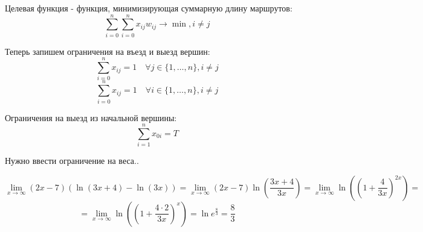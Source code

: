 \documentclass[%
10pt, %
final, %
oneside, %
onecolumn, %
centertags]{article} %
\theoremstyle{plain}
\theoremstyle{definition}
\theoremstyle{remark}
\begin{document}
Целевая функция - функция, минимизирующая суммарную длину маршрутов:
$$\sum\limits_{i=0}^n\sum\limits_{i=0}^n x_{ij}w_{ij}\to \min, i \neq j$$

Теперь запишем ограничения на въезд и выезд вершин:
$$\sum\limits_{i=0}^n x_{ij} = 1 \quad \forall j \in \{1, \ldots, n\}, i \neq j$$
$$\sum\limits_{i=0}^n x_{ij} = 1 \quad \forall i \in \{1, \ldots, n\}, i \neq j$$

Ограничения на выезд из начальной вершины:
$$\sum\limits_{i=1}^n x_{0i} = T$$

Нужно ввести ограничение на веса..

$$\lim\limits_{x \to \infty} (2x-7)(\ln(3x+4) - \ln (3x)) = \lim\limits_{x \to \infty} (2x-7)\ln\left(\frac{3x+4}{3x}\right) = \lim\limits_{x \to \infty} \ln \left(\left(1 + \frac{4}{3x}\right)^{2x}\right) = $$
$$ = \lim\limits_{x \to \infty} \ln \left(\left(1 + \frac{4 \cdot 2}{3x}\right)^{x}\right) = \ln e^{\frac{8}{3}} = \frac{8}{3}$$
\end{document}
